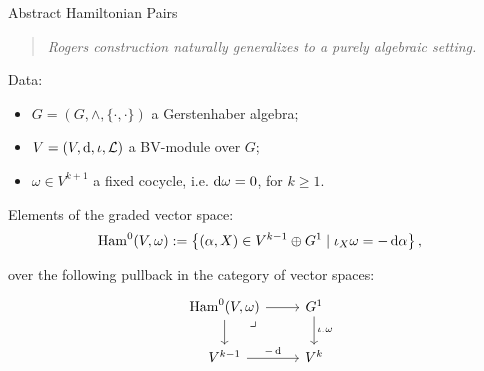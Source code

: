 \documentclass[beamer,10pt]{standalone}
\begin{document}
\checkpoint

\begin{frame}[fragile]{Abstract Hamiltonian Pairs}
  \begin{quote}
    \emph{Rogers construction naturally generalizes to a purely algebraic setting.}
  \end{quote}
  \vfill\pause

  Data:
  \begin{itemize}
    \item $G = (G,\wedge,\lbrace \cdot, \cdot \rbrace)$ a Gerstenhaber algebra;
    \item $V = (V,\mathop{}\!\mathrm{d},\iota,\mathcal{L})$ a BV-module over $G$;
    \item $\omega \in V^{k{+}1}$ a fixed cocycle, i.e. $\mathop{}\!\mathrm{d} \omega = 0$, for $k\geq 1$.
  \end{itemize}
  \vfill\pause

  \begin{defblock}
    Elements of the graded vector space:
	  $$
		\mathrm{Ham}^0(V, \omega) := \left\{ (\alpha, X) \in V^{k-1} \oplus G^1 \mid \iota_X \omega = -\mathop{}\!\mathrm{d}\alpha \right\},
    $$
  \end{defblock}
  \vfill\pause

  \begin{remblock}
     over the following pullback in the category of vector spaces:
	\begin{displaymath}
		\begin{tikzcd}
			\Ham^0(V, \omega) \arrow[r] \arrow[d] \ar[dr,"\lrcorner",very near start,phantom]& G^1 \ar[d,"\iota_{\cdot}\omega"] \\
			V^{k-1} \arrow[r, "-\d"] & V^{k}
		\end{tikzcd}
	\end{displaymath}
  \end{remblock}
\end{frame}
\end{document}
